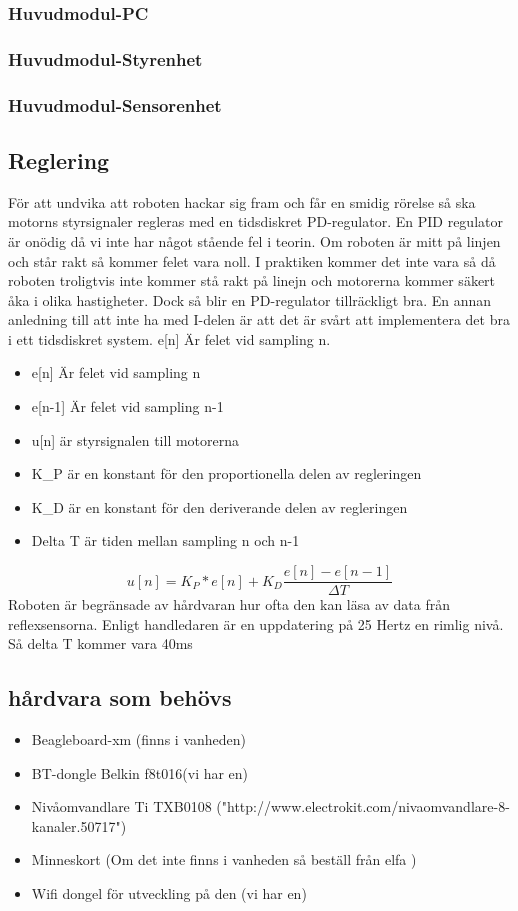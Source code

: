 \subsubsection{Huvudmodul-PC}
\subsubsection{Huvudmodul-Styrenhet}
\subsubsection{Huvudmodul-Sensorenhet}
\subsection{Reglering}
För att undvika att roboten hackar sig fram och får en smidig rörelse så ska motorns styrsignaler regleras med en tidsdiskret PD-regulator. En PID regulator är onödig då vi inte har något stående fel i teorin. Om roboten är mitt på linjen och står rakt så kommer felet vara noll. I praktiken kommer det inte vara så då roboten troligtvis inte kommer stå rakt på linejn och motorerna kommer säkert åka i olika hastigheter. Dock så blir en PD-regulator tillräckligt bra. En annan anledning till att inte ha med I-delen är att det är svårt att implementera det bra i ett tidsdiskret system. e[n] Är felet vid sampling n. 
\begin{itemize}
\item e[n] Är felet vid sampling n
\item e[n-1] Är felet vid sampling n-1
\item u[n] är styrsignalen till motorerna
\item K\_P är en konstant för den proportionella delen av regleringen
\item K\_D är en konstant för den deriverande delen av regleringen
\item Delta T är tiden mellan sampling n och n-1
 
\end{itemize}
 $$ u[n] = K_P*e[n] + K_D\frac{e[n]-e[n-1]}{\Delta T}$$
 Roboten är begränsade av hårdvaran hur ofta den kan läsa av data från reflexsensorna. Enligt handledaren är en uppdatering på 25 Hertz en rimlig nivå. Så delta T kommer vara 40ms
\subsection{hårdvara som behövs}
\begin{itemize}
\item Beagleboard-xm (finns i vanheden)
\item BT-dongle Belkin f8t016(vi har en)
\item Nivåomvandlare Ti TXB0108 ("http://www.electrokit.com/nivaomvandlare-8-kanaler.50717")
\item Minneskort (Om det inte finns i vanheden så beställ från elfa )
\item Wifi dongel för utveckling på den (vi har en)
\end{itemize}
